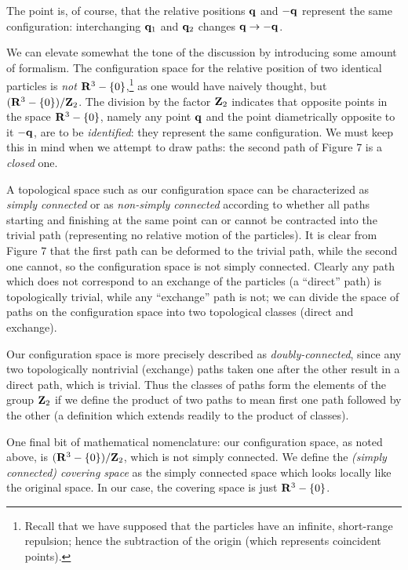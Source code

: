 \documentclass[12pt]{article}
\begin{document}
The point is, of course, that the relative positions ${\mathbf q}$ and
$-{\mathbf q}$ represent the same configuration: interchanging ${\mathbf q}_1$ and
${\mathbf q}_2$ changes ${\mathbf q}\to-{\mathbf q}$.

We can elevate somewhat the tone of the discussion by introducing some
amount of formalism. The configuration space for the relative position
of two identical particles is {\em not} ${\mathbf R}^3-\{0\}$,\footnote{Recall
  that we have supposed that the particles have an infinite,
  short-range repulsion; hence the subtraction of the origin (which
  represents coincident points).} as one would have naively thought,
but $({\mathbf R}^3-\{0\})/{\mathbf Z}_2$. The
division by the factor ${\mathbf Z}_2$ indicates that opposite points in the
space ${\mathbf R}^3-\{0\}$, namely any point ${\mathbf q}$ and the point
diametrically opposite to it $-{\mathbf q}$, are to be {\em
identified}: they represent the same configuration. We must keep this
in mind when we attempt to draw paths: the second path of Figure 7
is a {\em closed} one.

A topological space such as our configuration
space can be characterized as {\em simply connected} or
as {\em non-simply connected} according to whether all paths starting
and finishing at the same point can or cannot be contracted into the
trivial path (representing no relative motion of the particles). It is
clear from Figure 7 that the first path can be deformed to the
trivial path, while the second one cannot, so the configuration space
is not simply connected. Clearly any path which does not correspond to
an exchange of the particles (a ``direct'' path) is topologically
trivial, while any ``exchange'' path is not; we can divide the space
of paths on the configuration space into two topological classes (direct
and exchange). 

Our configuration space is more precisely described as
{\em doubly-connected}, since any two topologically nontrivial (exchange)
paths taken one after the other result in a direct path, which is
trivial. Thus the classes of paths form the elements of the
group ${\mathbf Z}_2$ if we
define the product of two paths to mean first one path followed by the
other (a definition which extends readily to the product of classes).

One final bit of mathematical nomenclature: our configuration space,
as noted above, is $({\mathbf R}^3-\{0\})/{\mathbf Z}_2$, which is not simply
connected. We define the {\em (simply connected) covering space} as
the simply connected space which looks locally like the original
space. In our case, the covering space is just ${\mathbf R}^3-\{0\}$.
\end{document}
